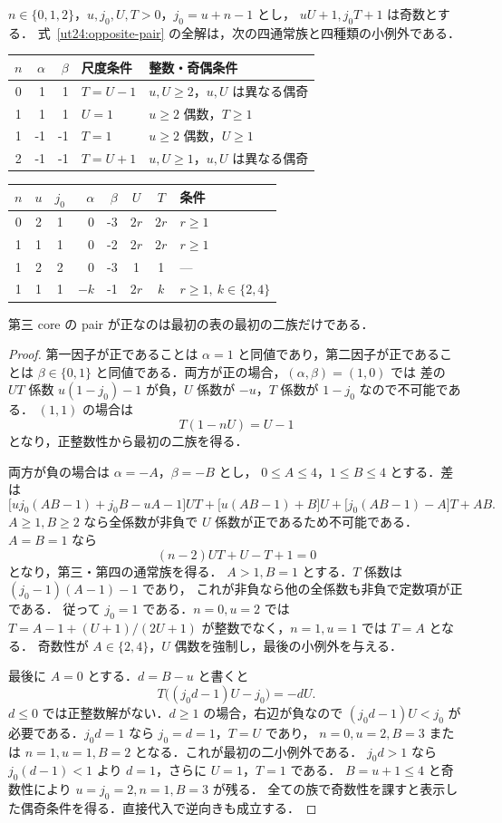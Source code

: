 \begin{proposition}[反対符号位置の全族]
\label{ut24:opposite-classification}
$n\in\{0,1,2\}$，$u,j_0,U,T>0$，$j_0=u+n-1$ とし，
$uU+1,j_0T+1$ は奇数とする．
式~\eqref{ut24:opposite-pair} の全解は，次の四通常族と四種類の小例外である．
\begin{center}\small
\begin{tabular}{c|rr|l|l}
 $n$&$\alpha$&$\beta$&尺度条件&整数・奇偶条件\\\hline
 0&1&1&$T=U-1$&$u,U\ge2$，$u,U$ は異なる偶奇\\
 1&1&1&$U=1$&$u\ge2$ 偶数，$T\ge1$\\
 1&-1&-1&$T=1$&$u\ge2$ 偶数，$U\ge1$\\
 2&-1&-1&$T=U+1$&$u,U\ge1$，$u,U$ は異なる偶奇
\end{tabular}
\end{center}
\begin{center}\small
\begin{tabular}{ccc|rr|cc|l}
 $n$&$u$&$j_0$&$\alpha$&$\beta$&$U$&$T$&条件\\\hline
 0&2&1&0&-3&$2r$&$2r$&$r\ge1$\\
 1&1&1&0&-2&$2r$&$2r$&$r\ge1$\\
 1&2&2&0&-3&1&1&---\\
 1&1&1&$-k$&-1&$2r$&$k$&$r\ge1,\ k\in\{2,4\}$
\end{tabular}
\end{center}
第三 core の pair が正なのは最初の表の最初の二族だけである．
\end{proposition}

\begin{proof}
第一因子が正であることは $\alpha=1$ と同値であり，第二因子が正であることは
$\beta\in\{0,1\}$ と同値である．両方が正の場合，$(\alpha,\beta)=(1,0)$ では
差の $UT$ 係数 $u(1-j_0)-1$ が負，$U$ 係数が $-u$，$T$ 係数が $1-j_0$ なので不可能である．
$(1,1)$ の場合は
\[
 T(1-nU)=U-1
\]
となり，正整数性から最初の二族を得る．

両方が負の場合は $\alpha=-A$，$\beta=-B$ とし，
$0\le A\le4$，$1\le B\le4$ とする．差は
\begin{equation}\label{ut24:opposite-coefficients}
 \bigl[uj_0(AB-1)+j_0B-uA-1\bigr]UT
 +\bigl[u(AB-1)+B\bigr]U
 +\bigl[j_0(AB-1)-A\bigr]T+AB.
\end{equation}
$A\ge1,B\ge2$ なら全係数が非負で $U$ 係数が正であるため不可能である．
$A=B=1$ なら
\[
 (n-2)UT+U-T+1=0
\]
となり，第三・第四の通常族を得る．
$A>1,B=1$ とする．$T$ 係数は $(j_0-1)(A-1)-1$ であり，
これが非負なら他の全係数も非負で定数項が正である．
従って $j_0=1$ である．$n=0,u=2$ では
$T=A-1+(U+1)/(2U+1)$ が整数でなく，$n=1,u=1$ では $T=A$ となる．
奇数性が $A\in\{2,4\}$，$U$ 偶数を強制し，最後の小例外を与える．

最後に $A=0$ とする．$d=B-u$ と書くと
\[
 T\bigl((j_0d-1)U-j_0\bigr)=-dU.
\]
$d\le0$ では正整数解がない．$d\ge1$ の場合，右辺が負なので
$(j_0d-1)U<j_0$ が必要である．$j_0d=1$ なら $j_0=d=1$，$T=U$ であり，
$n=0,u=2,B=3$ または $n=1,u=1,B=2$ となる．これが最初の二小例外である．
$j_0d>1$ なら $j_0(d-1)<1$ より $d=1$，さらに $U=1$，$T=1$ である．
$B=u+1\le4$ と奇数性により $u=j_0=2,n=1,B=3$ が残る．
全ての族で奇数性を課すと表示した偶奇条件を得る．直接代入で逆向きも成立する．
\end{proof}

